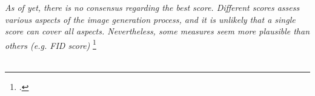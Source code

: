 \emph{
    As of yet, there is no consensus regarding the best score. Different scores assess various aspects of the image generation process, and it is unlikely that a single score can cover all aspects. Nevertheless, some measures seem more plausible than others (e.g. FID score)
}\footcite{paper:ganeval}\\\\